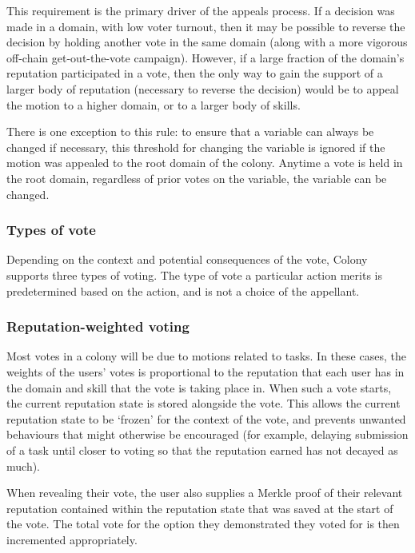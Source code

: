 This requirement is the primary driver of the appeals process. If a decision was made in a domain, with low voter turnout, then it may be possible to reverse the decision by holding another vote in the same domain (along with a more vigorous off-chain get-out-the-vote campaign). However, if a large fraction of the domain's reputation participated in a vote, then the only way to gain the support of a larger body of reputation (necessary to reverse the decision) would be to appeal the motion to a higher domain, or to a larger body of skills.

There is one exception to this rule: to ensure that a variable can always be changed if necessary, this threshold for changing the variable is ignored if the motion was appealed to the root domain of the colony. Anytime a vote is held in the root domain, regardless of prior votes on the variable, the variable can be changed.

\subsubsection{Types of vote}

Depending on the context and potential consequences of the vote, Colony supports three types of voting. The type of vote a particular action merits is predetermined based on the action, and is not a choice of the appellant.

\subsubsection*{Reputation-weighted voting}

Most votes in a colony will be due to motions related to tasks. In these cases, the weights of the users' votes is proportional to the reputation that each user has in the domain and skill that the vote is taking place in. When such a vote starts, the current reputation state is stored alongside the vote. This allows the current reputation state to be `frozen' for the context of the vote, and prevents unwanted behaviours that might otherwise be encouraged (for example, delaying submission of a task until closer to voting so that the reputation earned has not decayed as much).

When revealing their vote, the user also supplies a Merkle proof of their relevant reputation contained within the reputation state that was saved at the start of the vote. The total vote for the option they demonstrated they voted for is then incremented appropriately.

